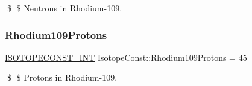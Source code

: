 \$ \$ Neutrons in Rhodium-\/109. \mbox{\label{group___isotope_const-_rhodium-_rh109_gabfd6b57cb7e7fb5288f8ab7686c9ae85}} 
\subsubsection{\texorpdfstring{Rhodium109\+Protons}{Rhodium109Protons}}
{\footnotesize\ttfamily \mbox{\hyperlink{group___isotope_const-_macros_ga5f18360b3e99483a35c32d789e62621c}{I\+S\+O\+T\+O\+P\+E\+C\+O\+N\+S\+T\+\_\+\+I\+NT}} Isotope\+Const\+::\+Rhodium109\+Protons = 45}

\$ \$ Protons in Rhodium-\/109. 